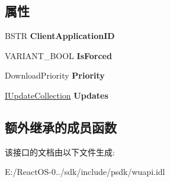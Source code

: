 \subsection*{属性}
\begin{DoxyCompactItemize}
\item 
\mbox{\label{interface_w_u_api_lib_1_1_i_update_downloader_a2047fd814d0cac3701375a3360d4e966}} 
B\+S\+TR {\bfseries Client\+Application\+ID}
\item 
\mbox{\label{interface_w_u_api_lib_1_1_i_update_downloader_a9bce1fd5e095f62be4d9d38d271585bb}} 
V\+A\+R\+I\+A\+N\+T\+\_\+\+B\+O\+OL {\bfseries Is\+Forced}
\item 
\mbox{\label{interface_w_u_api_lib_1_1_i_update_downloader_abd7898114af7345ef3bb2e5ed2ad9d29}} 
Download\+Priority {\bfseries Priority}
\item 
\mbox{\label{interface_w_u_api_lib_1_1_i_update_downloader_a80c4031b0eadd160c160d6071b65cd62}} 
\hyperlink{interface_w_u_api_lib_1_1_i_update_collection}{I\+Update\+Collection} {\bfseries Updates}
\end{DoxyCompactItemize}
\subsection*{额外继承的成员函数}


该接口的文档由以下文件生成\+:\begin{DoxyCompactItemize}
\item 
E\+:/\+React\+O\+S-\/0../sdk/include/psdk/wuapi.\+idl\end{DoxyCompactItemize}
